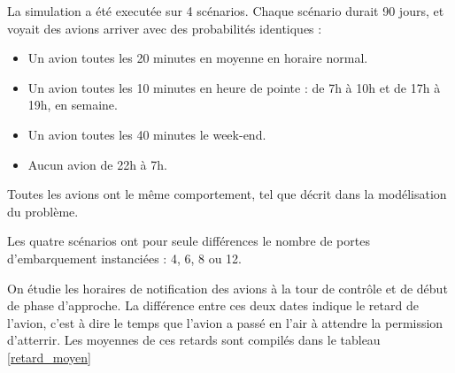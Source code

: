 
La simulation a été executée sur 4 scénarios. Chaque scénario durait 90 jours, et voyait des avions arriver avec des probabilités identiques :
\begin{itemize}
  \item Un avion toutes les 20 minutes en moyenne en horaire normal.
  \item Un avion toutes les 10 minutes en heure de pointe : de 7h à 10h et de 17h à 19h, en semaine.
  \item Un avion toutes les 40 minutes le week-end.
  \item Aucun avion de 22h à 7h.
\end{itemize}
Toutes les avions ont le même comportement, tel que décrit dans la modélisation du problème.

Les quatre scénarios ont pour seule différences le nombre de portes d'embarquement instanciées : 4, 6, 8 ou 12.

On étudie les horaires de notification des avions à la tour de contrôle et de début de phase d'approche. La différence entre ces deux dates indique le retard de l'avion, c'est à dire le temps que l'avion a passé en l'air à attendre la permission d'atterrir. Les moyennes de ces retards sont compilés dans le tableau \ref{retard_moyen}

